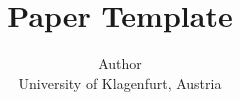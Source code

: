 \documentclass[a4paper]{article}
\begin{document}
\title{Paper Template}

\author{%
  Author\\
  University of Klagenfurt, Austria
}




\maketitle







\printbibliography{}
\end{document}
